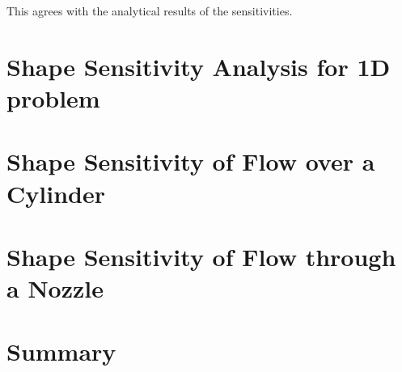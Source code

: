 This agrees with the analytical results of the sensitivities. 

\section{Shape Sensitivity Analysis for 1D problem}

\section{Shape Sensitivity of Flow over a Cylinder}

\section{Shape Sensitivity of Flow through a Nozzle}

\section{Summary}
